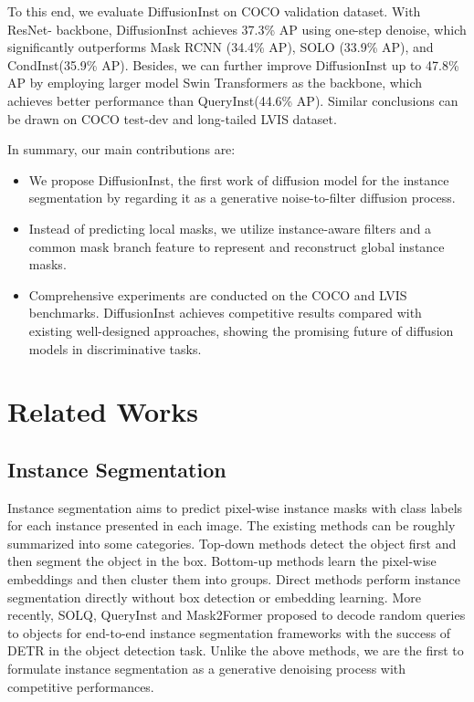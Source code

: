 \documentclass{article}
\begin{document}
To this end, we evaluate DiffusionInst on COCO\cite{COCO} validation dataset. With ResNet-\cite{ResNet} backbone, DiffusionInst achieves 37.3\% AP using one-step denoise, which significantly outperforms Mask RCNN\cite{maskrcnn} (34.4\% AP), SOLO\cite{SOLO} (33.9\% AP), and CondInst\cite{CondInst}(35.9\% AP). Besides, we can further improve DiffusionInst up to 47.8\% AP by employing larger model Swin Transformers\cite{swin} as the backbone, which achieves better performance than QueryInst\cite{QueryInst}(44.6\% AP). Similar conclusions can be drawn on COCO test-dev and long-tailed LVIS\cite{LVIS} dataset.



In summary, our main contributions are: 
\begin{itemize}
\item We propose DiffusionInst, the first work of diffusion model for the instance segmentation by regarding it as a generative noise-to-filter diffusion process. 
    \item Instead of predicting local masks, we utilize instance-aware filters and a common mask branch feature to represent and reconstruct global instance masks.
    \item Comprehensive experiments are conducted on the COCO and LVIS benchmarks. DiffusionInst achieves competitive results compared with existing well-designed approaches, showing the promising future of diffusion models in discriminative tasks.
\end{itemize}









\section{Related Works}
\subsection{Instance Segmentation}
Instance segmentation aims to predict pixel-wise instance masks with class labels for each instance presented in each image. The existing methods can be roughly summarized into some categories. Top-down methods\cite{LiFCIASS,maskrcnn,PANet,BlendMask} detect the object first and then segment the object in the box. Bottom-up methods\cite{SGN,SSAP,AE} learn the pixel-wise embeddings and then cluster them into groups. Direct methods\cite{SOLO,SOLOv2} perform instance segmentation directly without box detection or embedding learning. More recently, SOLQ\cite{dong2021solq}, QueryInst\cite{QueryInst} and Mask2Former\cite{Mask2Former} proposed to decode random queries to objects for end-to-end instance segmentation frameworks with the success of DETR\cite{DETR} in the object detection task. Unlike the above methods, we are the first to formulate instance segmentation as a generative denoising process with competitive performances.
\end{document}

